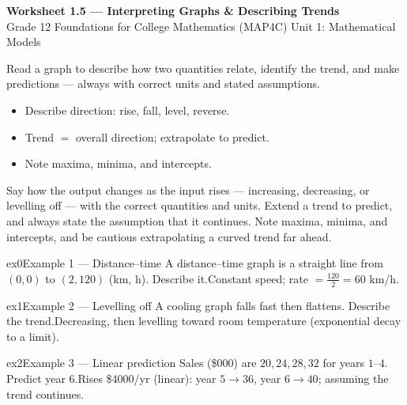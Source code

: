 \documentclass[11pt]{article}
\begin{document}
\begin{center}
{\LARGE\bfseries\color{titleblue}Worksheet 1.5 --- Interpreting Graphs \& Describing Trends}\\[2pt]
{\small Grade 12 Foundations for College Mathematics (MAP4C) \textperiodcentered{} Unit 1: Mathematical Models}
\end{center}

\begin{ideabox}
Read a graph to describe how two quantities relate, identify the trend, and make predictions — always with correct units and stated assumptions.
\begin{itemize}[leftmargin=*,itemsep=2pt]
  \item Describe direction: rise, fall, level, reverse.
  \item Trend $=$ overall direction; extrapolate to predict.
  \item Note maxima, minima, and intercepts.
\end{itemize}
\end{ideabox}

\begin{learnbox}
Say how the output changes as the input rises — increasing, decreasing, or levelling off — with the correct quantities and units.
Extend a trend to predict, and always state the assumption that it continues.
Note maxima, minima, and intercepts, and be cautious extrapolating a curved trend far ahead.
\end{learnbox}


\begin{example}{ex0}{Example 1 --- Distance–time}
A distance–time graph is a straight line from $(0,0)$ to $(2,120)$ (km, h). Describe it.\soln Constant speed; rate $=\tfrac{120}{2}=60$ km/h.
\end{example}

\begin{example}{ex1}{Example 2 --- Levelling off}
A cooling graph falls fast then flattens. Describe the trend.\soln Decreasing, then levelling toward room temperature (exponential decay to a limit).
\end{example}

\begin{example}{ex2}{Example 3 --- Linear prediction}
Sales (\$000) are $20,24,28,32$ for years $1$–$4$. Predict year $6$.\soln Rises \$4000/yr (linear): year $5\to36$, year $6\to40$; assuming the trend continues.
\end{example}
\end{document}
